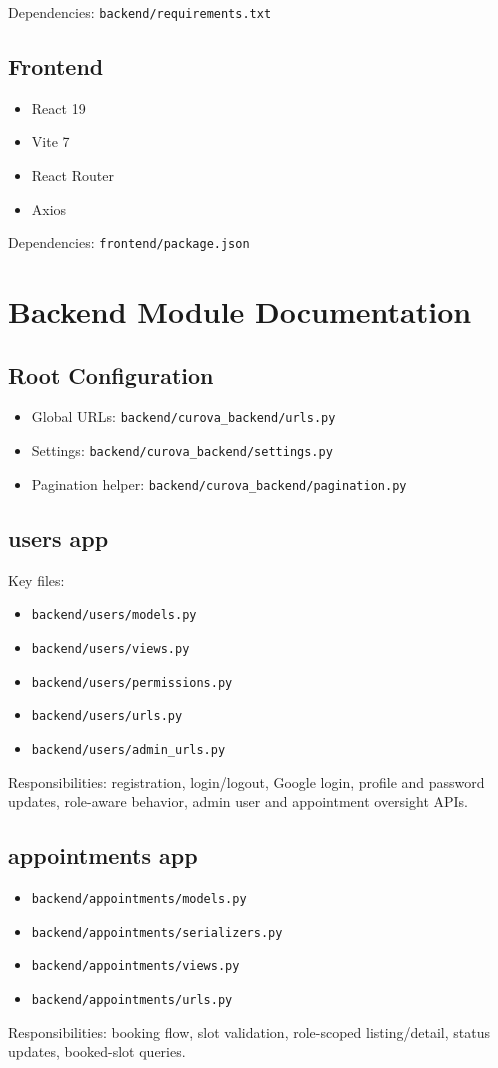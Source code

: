 \documentclass[12pt,a4paper]{article}
\begin{document}
Dependencies: \texttt{backend/requirements.txt}

\subsection{Frontend}
\begin{itemize}
  \item React 19
  \item Vite 7
  \item React Router
  \item Axios
\end{itemize}

Dependencies: \texttt{frontend/package.json}

\section{Backend Module Documentation}

\subsection{Root Configuration}
\begin{itemize}
  \item Global URLs: \texttt{backend/curova\_backend/urls.py}
  \item Settings: \texttt{backend/curova\_backend/settings.py}
  \item Pagination helper: \texttt{backend/curova\_backend/pagination.py}
\end{itemize}

\subsection{users app}
Key files:
\begin{itemize}
  \item \texttt{backend/users/models.py}
  \item \texttt{backend/users/views.py}
  \item \texttt{backend/users/permissions.py}
  \item \texttt{backend/users/urls.py}
  \item \texttt{backend/users/admin\_urls.py}
\end{itemize}
Responsibilities: registration, login/logout, Google login, profile and password updates, role-aware behavior, admin user and appointment oversight APIs.

\subsection{appointments app}
\begin{itemize}
  \item \texttt{backend/appointments/models.py}
  \item \texttt{backend/appointments/serializers.py}
  \item \texttt{backend/appointments/views.py}
  \item \texttt{backend/appointments/urls.py}
\end{itemize}
Responsibilities: booking flow, slot validation, role-scoped listing/detail, status updates, booked-slot queries.
\end{document}
